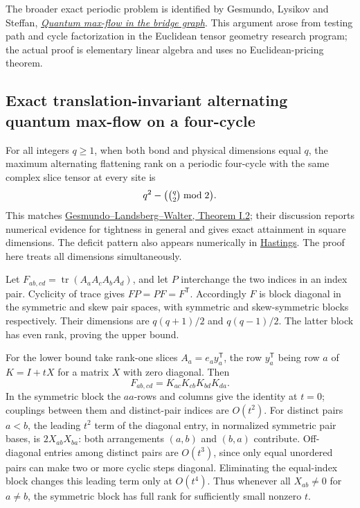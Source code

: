\documentclass[
  11pt,
]{article}
\begin{document}
The broader exact periodic problem is identified by Gesmundo, Lysikov
and Steffan,
\href{https://arxiv.org/html/2212.09794v2\#S1.SS3}{\emph{Quantum
max-flow in the bridge graph}}. This argument arose from testing path
and cycle factorization in the Euclidean tensor geometry research
program; the actual proof is elementary linear algebra and uses no
Euclidean-pricing theorem.

\subsection{Exact translation-invariant alternating quantum max-flow on
a
four-cycle}\label{exact-translation-invariant-alternating-quantum-max-flow-on-a-four-cycle}

For all integers \(q\ge1\), when both bond and physical dimensions equal
\(q\), the maximum alternating flattening rank on a periodic four-cycle
with the same complex slice tensor at every site is \[
 q^2-\bigl(\tbinom q2\bmod 2\bigr).
\] This matches
\href{https://arxiv.org/pdf/1801.09106}{Gesmundo--Landsberg--Walter,
Theorem I.2}; their discussion reports numerical evidence for tightness
in general and gives exact attainment in square dimensions. The deficit
pattern also appears numerically in
\href{https://arxiv.org/abs/1603.03717}{Hastings}. The proof here treats
all dimensions simultaneously.

Let \(F_{ab,cd}=\operatorname{tr}(A_aA_cA_bA_d)\), and let \(P\)
interchange the two indices in an index pair. Cyclicity of trace gives
\(FP=PF=F^{\mathsf T}\). Accordingly \(F\) is block diagonal in the
symmetric and skew pair spaces, with symmetric and skew-symmetric blocks
respectively. Their dimensions are \(q(q+1)/2\) and \(q(q-1)/2\). The
latter block has even rank, proving the upper bound.

For the lower bound take rank-one slices \(A_a=e_a y_a^{\mathsf T}\),
the row \(y_a^{\mathsf T}\) being row \(a\) of \(K=I+tX\) for a matrix
\(X\) with zero diagonal. Then \[
 F_{ab,cd}=K_{ac}K_{cb}K_{bd}K_{da}.
\] In the symmetric block the \(aa\)-rows and columns give the identity
at \(t=0\); couplings between them and distinct-pair indices are
\(O(t^2)\). For distinct pairs \(a<b\), the leading \(t^2\) term of the
diagonal entry, in normalized symmetric pair bases, is
\(2X_{ab}X_{ba}\): both arrangements \((a,b)\) and \((b,a)\) contribute.
Off-diagonal entries among distinct pairs are \(O(t^3)\), since only
equal unordered pairs can make two or more cyclic steps diagonal.
Eliminating the equal-index block changes this leading term only at
\(O(t^4)\). Thus whenever all \(X_{ab}\ne0\) for \(a\ne b\), the
symmetric block has full rank for sufficiently small nonzero \(t\).
\end{document}
